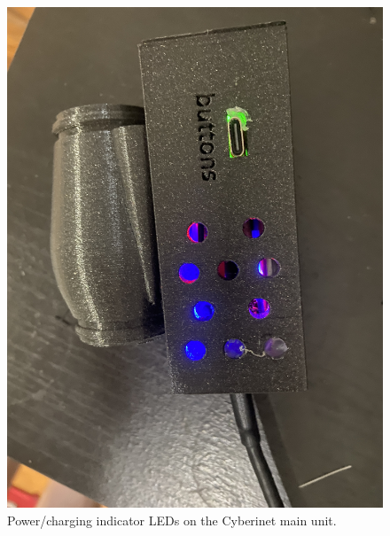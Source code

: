 \begin{figure}
    \centering
    \includegraphics[scale=0.05]{diagrams/IMG_2210.JPG}
    \caption{Power/charging indicator LEDs on the Cyberinet main unit.}
    \label{fig:CyberinetLEDs}
\end{figure}

